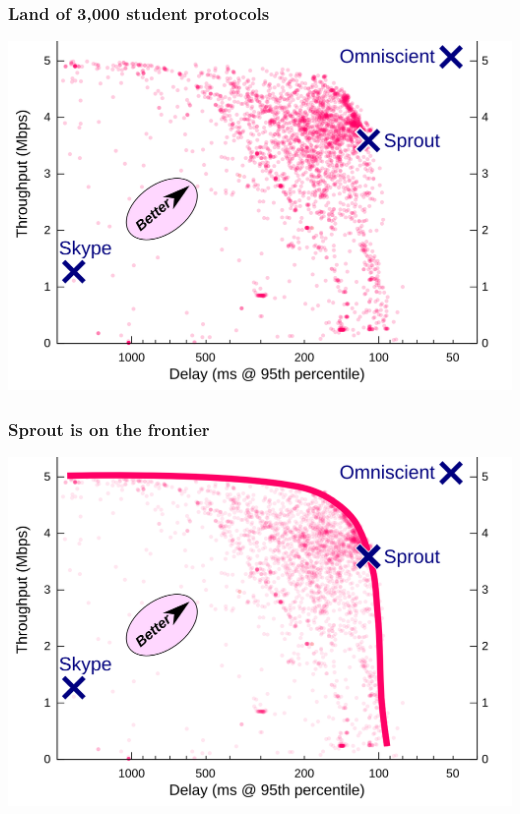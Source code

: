 \documentclass[svgnames]{beamer}
\begin{document}
\begin{frame}
\frametitle{Land of 3,000 student protocols}

\begin{centering}
\includegraphics[width=0.9\columnwidth]{pointplot.png}

\end{centering}

\end{frame}

\begin{frame}
\frametitle{Sprout is on the frontier}

\begin{centering}
\includegraphics[width=0.9\columnwidth]{pointplot-withhull.png}

\end{centering}

\end{frame}

%
%
%
\end{document}
